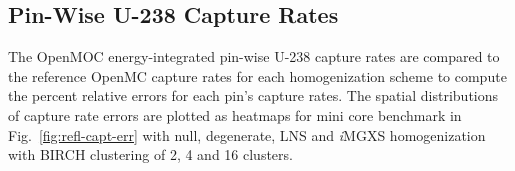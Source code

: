 \documentclass[12pt,twoside]{mitthesis-exec}
\begin{document}
%

\subsection*{Pin-Wise U-238 Capture Rates}

The OpenMOC energy-integrated pin-wise U-238 capture rates are compared to the reference OpenMC capture rates for each homogenization scheme to compute the percent relative errors for each pin's capture rates. The spatial distributions of capture rate errors are plotted as heatmaps for mini core benchmark in Fig.~\ref{fig:refl-capt-err} with null, degenerate, LNS and \textit{i}MGXS homogenization with BIRCH clustering of 2, 4 and 16 clusters.
\end{document}
